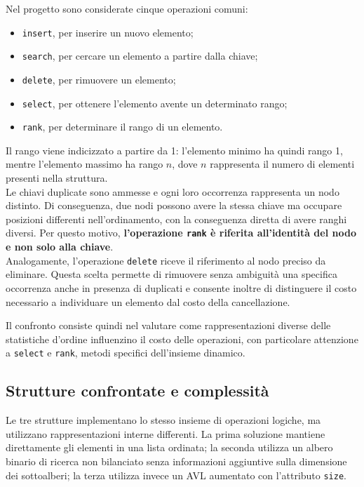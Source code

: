 \documentclass[a4paper,11pt]{article}
\begin{document}
Nel progetto sono considerate cinque operazioni comuni:
\begin{itemize}
    \item \texttt{insert}, per inserire un nuovo elemento;
    
    \item \texttt{search}, per cercare un elemento a partire dalla chiave;
    
    \item \texttt{delete}, per rimuovere un elemento;
    
    \item \texttt{select}, per ottenere l'elemento avente un determinato rango;
    
    \item \texttt{rank}, per determinare il rango di un elemento.
\end{itemize}
Il rango viene indicizzato a partire da 1: l'elemento minimo ha quindi rango 1, mentre l'elemento massimo ha rango $n$, dove $n$ rappresenta il numero di elementi presenti nella struttura. \\
Le chiavi duplicate sono ammesse e ogni loro occorrenza rappresenta un nodo distinto. Di conseguenza, due nodi possono avere la stessa chiave ma occupare posizioni differenti nell'ordinamento, con la conseguenza diretta di avere ranghi diversi. Per questo motivo, \textbf{l'operazione \texttt{rank} è riferita all'identità del nodo e non solo alla chiave}.\\
Analogamente, l'operazione \texttt{delete} riceve il riferimento al nodo preciso da eliminare. Questa scelta permette di rimuovere senza ambiguità una specifica occorrenza anche in presenza di duplicati e consente inoltre di distinguere il costo necessario a individuare un elemento dal costo della cancellazione.

Il confronto consiste quindi nel valutare come rappresentazioni diverse delle statistiche d'ordine influenzino il costo delle operazioni, con particolare attenzione a \texttt{select} e \texttt{rank}, metodi specifici dell'insieme dinamico.


\subsection{Strutture confrontate e complessità}
Le tre strutture implementano lo stesso insieme di operazioni logiche, ma utilizzano rappresentazioni interne differenti. La prima soluzione mantiene direttamente gli elementi in una lista ordinata; la seconda utilizza un albero binario di ricerca non bilanciato senza informazioni aggiuntive sulla dimensione dei sottoalberi; la terza utilizza invece un AVL aumentato con l'attributo \texttt{size}.
\end{document}
